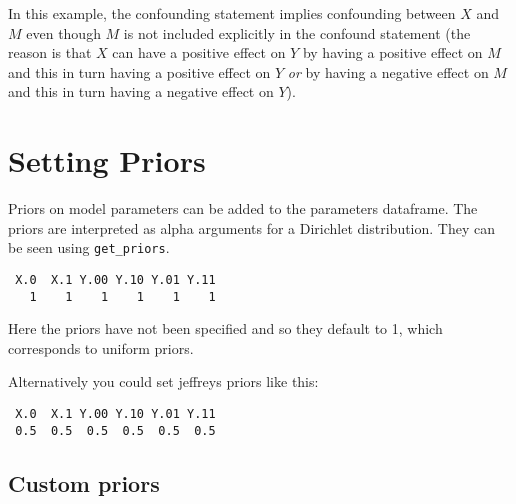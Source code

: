 \documentclass[
  12pt,
]{book}
\newenvironment{Shaded}{\begin{snugshade}}{\end{snugshade}}
\newcommand{\DataTypeTok}[1]{\textcolor[rgb]{0.13,0.29,0.53}{#1}}
\newcommand{\KeywordTok}[1]{\textcolor[rgb]{0.13,0.29,0.53}{\textbf{#1}}}
\newcommand{\NormalTok}[1]{#1}
\newcommand{\OperatorTok}[1]{\textcolor[rgb]{0.81,0.36,0.00}{\textbf{#1}}}
\newcommand{\StringTok}[1]{\textcolor[rgb]{0.31,0.60,0.02}{#1}}
\begin{document}
In this example, the confounding statement implies confounding between \(X\) and \(M\) even though \(M\) is not included explicitly in the confound statement (the reason is that \(X\) can have a positive effect on \(Y\) by having a positive effect on \(M\) and this in turn having a positive effect on \(Y\) \emph{or} by having a negative effect on \(M\) and this in turn having a negative effect on \(Y\)).

\hypertarget{priors}{%
\section{Setting Priors}\label{priors}}

Priors on model parameters can be added to the parameters dataframe. The priors are interpreted as alpha arguments for a Dirichlet distribution. They can be seen using \texttt{get\_priors}.

\begin{Shaded}
\end{Shaded}

\begin{verbatim}
 X.0  X.1 Y.00 Y.10 Y.01 Y.11 
   1    1    1    1    1    1 
\end{verbatim}

Here the priors have not been specified and so they default to 1, which corresponds to uniform priors.

Alternatively you could set jeffreys priors like this:

\begin{Shaded}
\end{Shaded}

\begin{verbatim}
 X.0  X.1 Y.00 Y.10 Y.01 Y.11 
 0.5  0.5  0.5  0.5  0.5  0.5 
\end{verbatim}

\hypertarget{custom-priors}{%
\subsection{Custom priors}\label{custom-priors}}
\end{document}
